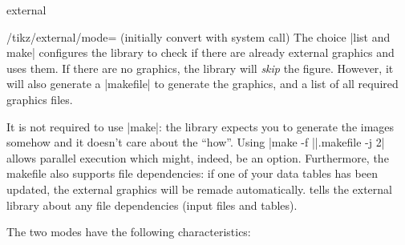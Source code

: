 {\begin{pgfplotslibrary}{external}
\begin{key}{/tikz/external/mode= (initially convert with system call)}
        The choice |list and make| configures the library to check if there are
        already external graphics and uses them. If there are no graphics, the
        library will \emph{skip} the figure. However, it will also generate a
        |makefile| to generate the graphics, and a list of all required
        graphics files.

        It is not required to use |make|: the library expects you to generate
        the images somehow and it doesn't care about the ``how''. Using
        |make -f ||.makefile -j 2| allows parallel
        execution which might, indeed, be an option. Furthermore, the makefile
        also supports file dependencies: if one of your data tables has been
        updated, the external graphics will be remade automatically.
        \PGFPlots{} tells the external library about any file dependencies
        (input files and tables).

        The two modes have the following characteristics:
    \end{key}


\end{pgfplotslibrary}}
